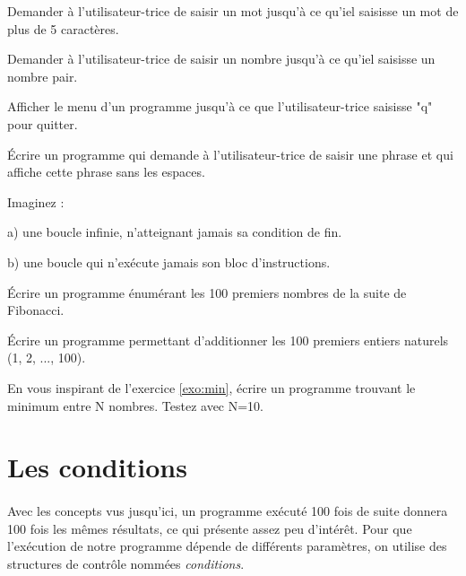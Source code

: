 \documentclass[11pt, a4paper]{book}
\begin{document}
\begin{exercice}
Demander à l'utilisateur-trice de saisir un mot jusqu'à ce qu'iel saisisse un mot de plus de 5 caractères.
\end{exercice}

\begin{exercice}
Demander à l'utilisateur-trice de saisir un nombre jusqu'à ce qu'iel saisisse un nombre pair. 
\end{exercice}

\begin{exercice}
Afficher le menu d'un programme jusqu'à ce que l'utilisateur-trice saisisse "q" pour quitter.
\end{exercice}


\begin{exercice}
Écrire un programme qui demande à l'utilisateur-trice de saisir une phrase et qui affiche cette phrase sans les espaces.
\end{exercice}


\begin{exercice}
Imaginez :
\item[a)] une boucle infinie, n'atteignant jamais sa condition de fin.
\item[b)] une boucle qui n'exécute jamais son bloc d'instructions.
\end{exercice}

\begin{exercice}
Écrire un programme énumérant les 100 premiers nombres de la suite de Fibonacci.
\end{exercice}

\begin{exercice}
Écrire un programme permettant d'additionner les 100 premiers entiers naturels (1, 2, ..., 100). %
\end{exercice}

\begin{exercice}
En vous inspirant de l'exercice \ref{exo:min}, écrire un programme trouvant le minimum entre N nombres.
Testez avec N=10.
\end{exercice}


\newpage

\section{Les conditions}

\paragraph{} Avec les concepts vus jusqu'ici, un programme exécuté 100 fois de suite donnera 100 fois les mêmes résultats, ce qui présente assez peu d'intérêt. Pour que l'exécution de notre programme dépende de différents paramètres, on utilise des structures de contrôle nommées \textit{conditions}.
\end{document}
